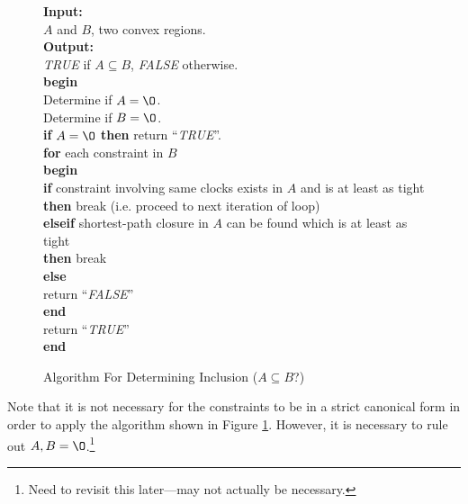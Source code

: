 \begin{figure}
\begin{small}
\textbf{Input:} \\
\hspace*{0.15in}$A$ and $B$, two convex regions. \\
\textbf{Output:} \\
\hspace*{0.15in} \emph{TRUE} if $A \subseteq B$, \emph{FALSE} otherwise.\\
\textbf{begin} \\
\hspace*{0.15in}Determine if $A = \O$. \\
\hspace*{0.15in}Determine if $B = \O$. \\
\hspace*{0.15in}\textbf{if} $A = \O$ \textbf{then} return ``\emph{TRUE}''. \\
\hspace*{0.15in}\textbf{for} each constraint in $B$ \\
\hspace*{0.30in}\textbf{begin} \\
\hspace*{0.45in}\textbf{if} constraint involving same clocks exists in $A$ and is at least as tight \\
\hspace*{0.60in}\textbf{then} break (i.e. proceed to next iteration of loop)\\
\hspace*{0.45in}\textbf{elseif} shortest-path closure in $A$ can be found which is at least as tight \\
\hspace*{0.60in}\textbf{then} break \\
\hspace*{0.45in}\textbf{else} \\
\hspace*{0.60in}return ``\emph{FALSE}'' \\
\hspace*{0.30in}\textbf{end} \\
\hspace*{0.15in}return ``\emph{TRUE}'' \\
\textbf{end}
\end{small}
\caption{Algorithm For Determining Inclusion ($A \subseteq B$?)}
\label{fig:siop0:sirn0:sinc0:00}
\end{figure}

Note that it is not necessary for the constraints to
be in a strict canonical
form in order to apply the algorithm shown 
in Figure \ref{fig:siop0:sirn0:sinc0:00}.  However, it is necessary
to rule out $A, B = \O$.\footnote{Need to revisit this later---may not
actually be necessary.}



